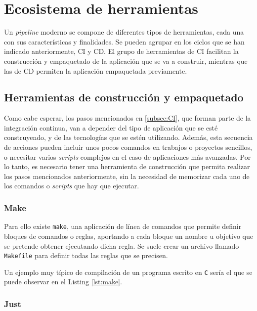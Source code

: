 \section{Ecosistema de herramientas}

Un \textit{pipeline} moderno se compone de diferentes tipos de herramientas, cada una con sus características y finalidades. Se pueden agrupar en los ciclos que se han indicado anteriormente, CI y CD. El grupo de herramientas de CI facilitan la construcción y empaquetado de la aplicación que se va a construir, mientras que las de CD permiten la aplicación empaquetada previamente.

\subsection*{Herramientas de construcción y empaquetado}

Como cabe esperar, los pasos mencionados en \ref{subsec:CI}, que forman parte de la integración continua, van a depender del tipo de aplicación que se esté construyendo, y de las tecnologías que se estén utilizando. Además, esta secuencia de acciones pueden incluir unos pocos comandos en trabajos o proyectos sencillos, o necesitar varios \textit{scripts} complejos en el caso de aplicaciones más avanzadas. Por lo tanto, es necesario tener una herramienta de construcción que permita realizar los pasos mencionados anteriormente, sin la necesidad de memorizar cada uno de los comandos o \textit{scripts} que hay que ejecutar.

\subsubsection*{Make}
\label{subsec:make}

Para ello existe \texttt{make}\cite{make}, una aplicación de línea de comandos que permite definir bloques de comandos o reglas, aportando a cada bloque un nombre u objetivo que se pretende obtener ejecutando dicha regla. Se suele crear un archivo llamado \texttt{Makefile} para definir todas las reglas que se precisen.

Un ejemplo muy típico de compilación de un programa escrito en \texttt{C} sería el que se puede observar en el Listing \ref{lst:make}.

\subsubsection*{Just}
\label{subsec:just}

